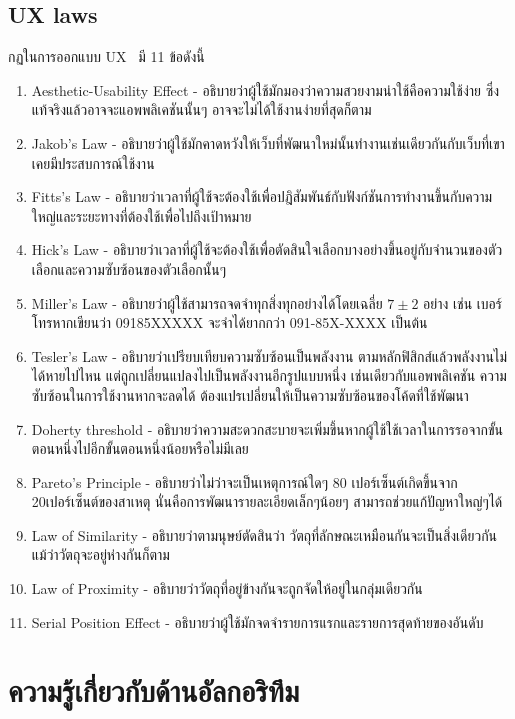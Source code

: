 \subsection{UX laws}
\label{subsec:uxlaws}
กฏในการออกแบบ UX~\cite{uxui} มี 11 ข้อดังนี้
\begin{enumerate}
  \item Aesthetic-Usability Effect - อธิบายว่าผู้ใช้มักมองว่าความสวยงามน่าใช้คือความใช้ง่าย 
      ซึ่งแท้จริงแล้วอาจจะแอพพลิเคชันนั้นๆ อาจจะไม่ได้ใช้งานง่ายที่สุดก็ตาม 
  \item Jakob's Law - อธิบายว่าผู้ใช้มักคาดหวังให้เว็บที่พัฒนาใหม่นั้นทำงานเช่นเดียวกันกับเว็บที่เขาเคยมีประสบการณ์ใช้งาน
  \item Fitts's Law - อธิบายว่าเวลาที่ผู้ใช้จะต้องใช้เพื่อปฎิสัมพันธ์กับฟังก์ชันการทำงานขึ้นกับความใหญ่และระยะทางที่ต้องใช้เพื่อไปถึงเป้าหมาย
  \item Hick's Law - อธิบายว่าเวลาที่ผู้ใช้จะต้องใช้เพื่อตัดสินใจเลือกบางอย่างขึ้นอยู่กับจำนวนของตัวเลือกและความซับซ้อนของตัวเลือกนั้นๆ
  \item Miller's Law - อธิบายว่าผู้ใช้สามารถจดจำทุกสิ่งทุกอย่างได้โดยเฉลี่ย $7\pm2$ อย่าง 
        เช่น เบอร์โทรหากเขียนว่า 09185XXXXX จะจำได้ยากกว่า 091-85X-XXXX เป็นต้น
  \item Tesler's Law - อธิบายว่าเปรียบเทียบความซับซ้อนเป็นพลังงาน ตามหลักฟิสิกส์แล้วพลังงานไม่ได้หายไปไหน 
        แต่ถูกเปลี่ยนแปลงไปเป็นพลังงานอีกรูปแบบหนึ่ง เช่นเดียวกับแอพพลิเคชัน ความซับซ้อนในการใช้งานหากจะลดได้ 
        ต้องแปรเปลี่ยนให้เป็นความซับซ้อนของโค้ดที่ใช้พัฒนา
  \item Doherty threshold - อธิบายว่าความสะดวกสะบายจะเพิ่มขึ้นหากผู้ใช้ใช้เวลาในการรอจากขั้นตอนหนึ่งไปอีกขั้นตอนหนึ่งน้อยหรือไม่มีเลย
  \item Pareto's  Principle - อธิบายว่าไม่ว่าจะเป็นเหตุการณ์ใดๆ 80 เปอร์เซ็นต์เกิดขึ้นจาก 20เปอร์เซ็นต์ของสาเหตุ นั่นคือการพัฒนารายละเอียดเล็กๆน้อยๆ สามารถช่วยแก้ปัญหาใหญ่ๆได้
  \item Law of Similarity - อธิบายว่าตามนุษย์ตัดสินว่า วัตถุที่ลักษณะเหมือนกันจะเป็นสิ่งเดียวกัน แม้ว่าวัตถุจะอยู่ห่างกันก็ตาม
  \item Law of Proximity - อธิบายว่าวัตถุที่อยู่ข้างกันจะถูกจัดให้อยู่ในกลุ่มเดียวกัน
  \item Serial Position Effect - อธิบายว่าผู้ใช้มักจดจำรายการแรกและรายการสุดท้ายของอันดับ
\end{enumerate}

\section{ความรู้เกี่ยวกับด้านอัลกอริทึม}
\label{sec:rmp}
